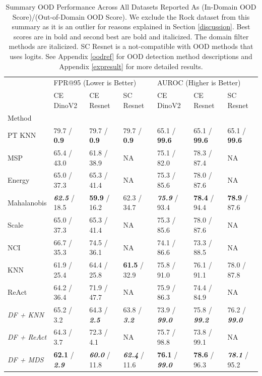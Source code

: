 \documentclass[letterpaper]{article} %
\theoremstyle{plain}
\theoremstyle{definition}
\theoremstyle{remark}
\begin{document}
\begin{table}
\centering
\caption{Summary OOD Performance Across All Datasets Reported As (In-Domain OOD Score)/(Out-of-Domain OOD Score). We exclude the Rock dataset from this summary as it is an outlier for reasons explained in Section \ref{discussion}.  Best scores are in bold and second best are bold and italicized. The domain filter methods are italicized. SC Resnet is a not-compatible with OOD methods that uses logits.  See Appendix \ref{oodref} for OOD detection method descriptions and Appendix \ref{expresult} for more detailed results.}
\label{tab:summary}
\begin{tabular}{lllllll}
\toprule
 & \multicolumn{3}{l}{FPR@95 (Lower is Better)} & \multicolumn{3}{l}{AUROC (Higher is Better)} \\
 & CE DinoV2 & CE Resnet & SC Resnet & CE DinoV2 & CE Resnet & SC Resnet \\
Method &  &  &  &  &  &  \\
\midrule
PT KNN & 79.7 / \textbf{0.9} & 79.7 / \textbf{0.9}  & 79.7 / \textbf{0.9}  & 65.1 / \textbf{99.6} & 65.1 / \textbf{99.6} & 65.1 / \textbf{99.6} \\
MSP & 65.4 / 43.0 & 61.8 / 38.9 & NA & 75.1 / 82.0 & 78.3 / 87.4 & NA \\
Energy & 65.0 / 37.3 & 65.3 / 41.4 & NA & 75.3 / 85.6 & 78.0 / 87.6 & NA \\
Mahalanobis & \textbf{\textit{62.5}} / 18.5 & \textbf{59.9} / 16.2 & 62.3 / 34.7 & \textbf{\textit{75.9}} / 93.4 & \textbf{78.4} / 94.4 & \textbf{78.9} / 87.6 \\
Scale & 65.0 / 37.3 & 65.3 / 41.4 & NA & 75.3 / 85.6 & 78.0 / 87.6 & NA \\
NCI & 66.7 / 35.3 & 74.5 / 36.1 & NA & 74.1 / 86.6 & 73.3 / 88.5 & NA \\
KNN & 61.9 / 25.4 & 64.4 / 25.8 & \textbf{61.5} / 32.9 & 75.8 / 91.0 & 76.1 / 91.1 & 78.0 / 87.8 \\
ReAct & 64.2 / 36.4 & 71.9 / 47.7 & NA & 75.9 / 86.3 & 74.4 / 84.9 & NA \\
\textit{DF + KNN} & 65.2 / 3.2 & 64.3 / \textbf{\textit{2.5}} & 63.8 / \textbf{\textit{3.2}} & 73.9 / \textbf{\textit{99.0}} & 75.8 / \textbf{\textit{99.2}} & 76.2 / \textbf{\textit{99.0}} \\
\textit{DF + ReAct} & 64.3 / 3.7 & 72.3 / 4.1 & NA & 75.7 / 98.8 & 73.8 / 99.1 & NA \\
\textit{DF + MDS} & \textbf{62.1} / \textbf{\textit{2.9}} & \textbf{\textit{60.0}} / 11.8 & \textbf{\textit{62.4}} / 11.6 & \textbf{76.1} / \textbf{\textit{99.0}} & \textbf{78.6} / 96.3 & \textbf{\textit{78.1}} / 95.2 \\
\bottomrule
\end{tabular}
\end{table}
\end{document}

